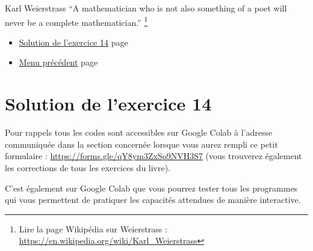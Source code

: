 \documentclass[a4paper,11pt]{book}
\begin{document}
\begin{myquote}{Karl Weierstrass}
\enquote{A mathematician who is not also something of a poet will never be a
complete mathematician.}
\footnote{Lire la page Wikipédia sur Weierstrass : \url{https://en.wikipedia.org/wiki/Karl_Weierstrass}}
\end{myquote}

\clearpage

\label{org882de4a}
\begin{itemize}
\item \hyperref[orgfeec3ba]{Solution de l'exercice 14}
page~\pageref{page:sec9.2.1sol14}
\item \hyperref[orgcabe6f1]{Menu précédent}
page~\pageref{page:sols-capacities-menu}
\end{itemize}

\clearpage
\section{Solution de l'exercice 14}
\label{sec:org5eda210}
\label{orgfeec3ba}
\label{page:sec9.2.1sol14}

Pour rappels tous les codes sont accessibles sur Google Colab à
l'adresse communiquée dans la section concernée lorsque vous
aurez rempli ce petit formulaire : \url{https://forms.gle/qY8ym3ZxSo9NVH3S7}
(vous trouverez également les corrections de tous les exercices du
livre).

C'est également sur Google Colab que vous pourrez tester tous les
programmes qui vous permettent de pratiquer les capacités attendues
de manière interactive.

\clearpage
\end{document}
